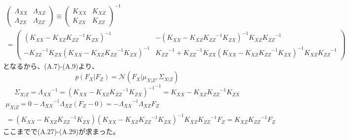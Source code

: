 \documentclass{jsarticle}
\begin{document}
\begin{equation}
\begin{split}
\begin{pmatrix}
\Lambda_{XX} & \Lambda_{XZ}\\
\Lambda_{ZX} & \Lambda_{ZZ} 
\end{pmatrix}
\equiv \begin{pmatrix}
K_{XX} & K_{XZ}\\
K_{ZX} & K_{ZZ} 
\end{pmatrix}^{-1}\\
=\begin{pmatrix}
(K_{XX} - K_{XZ}{K_{ZZ}}^{-1}K_{ZX})^{-1} & -(K_{XX} - K_{XZ}{K_{ZZ}}^{-1}K_{ZX})^{-1}K_{XZ}{K_{ZZ}}^{-1}\\
-{K_{ZZ}}^{-1}K_{ZX}(K_{XX} - K_{XZ}{K_{ZZ}}^{-1}K_{ZX})^{-1} & {K_{ZZ}}^{-1} + {K_{ZZ}}^{-1}K_{ZX}(K_{XX} - K_{XZ}{K_{ZZ}}^{-1}K_{ZX})^{-1} K_{XZ}{K_{ZZ}}^{-1}
\end{pmatrix}
\end{split}
\end{equation}
となるから、(A.7)-(A.9)より、
\begin{equation}
p(F_X | F_Z) = \mathcal{N}(F_X | \mu_{X | Z}, \Sigma_{X | Z})
\end{equation}
\begin{equation}
\Sigma_{X | Z} = {\Lambda_{XX}}^{-1} = {(K_{XX} - K_{XZ}{K_{ZZ}}^{-1}K_{ZX})^{-1}}^{-1}
=K_{XX} - K_{XZ}{K_{ZZ}}^{-1}K_{ZX}
\end{equation}
\begin{equation}
\begin{split}
\mu_{X | Z} = 0 - {\Lambda_{XX}}^{-1} \Lambda_{XZ}(F_Z - 0)
= - {\Lambda_{XX}}^{-1} \Lambda_{XZ}F_Z\\
= (K_{XX} - K_{XZ}{K_{ZZ}}^{-1}K_{ZX}) (K_{XX} - K_{XZ}{K_{ZZ}}^{-1}K_{ZX})^{-1}K_{XZ}{K_{ZZ}}^{-1} F_Z
= K_{XZ}{K_{ZZ}}^{-1} F_Z
\end{split}
\end{equation}
ここまでで(A.27)-(A.29)が求まった。
\end{document}
